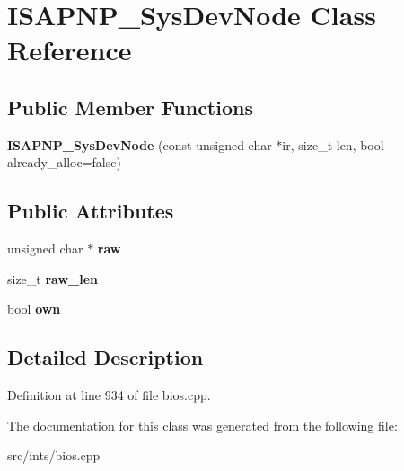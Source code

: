 \hypertarget{classISAPNP__SysDevNode}{\section{I\-S\-A\-P\-N\-P\-\_\-\-Sys\-Dev\-Node Class Reference}
\label{classISAPNP__SysDevNode}
}
\subsection*{Public Member Functions}
\begin{DoxyCompactItemize}
\item 
\hypertarget{classISAPNP__SysDevNode_a08b686d61113d6cd7a7783568515481f}{{\bfseries I\-S\-A\-P\-N\-P\-\_\-\-Sys\-Dev\-Node} (const unsigned char $\ast$ir, size\-\_\-t len, bool already\-\_\-alloc=false)}\label{classISAPNP__SysDevNode_a08b686d61113d6cd7a7783568515481f}

\end{DoxyCompactItemize}
\subsection*{Public Attributes}
\begin{DoxyCompactItemize}
\item 
\hypertarget{classISAPNP__SysDevNode_a88b23d674e4b48999a46d838dff47b7b}{unsigned char $\ast$ {\bfseries raw}}\label{classISAPNP__SysDevNode_a88b23d674e4b48999a46d838dff47b7b}

\item 
\hypertarget{classISAPNP__SysDevNode_a599de9be7c4895bfc76204eed3743fe4}{size\-\_\-t {\bfseries raw\-\_\-len}}\label{classISAPNP__SysDevNode_a599de9be7c4895bfc76204eed3743fe4}

\item 
\hypertarget{classISAPNP__SysDevNode_a0a342171b0ed0789f665868c14e9e6cc}{bool {\bfseries own}}\label{classISAPNP__SysDevNode_a0a342171b0ed0789f665868c14e9e6cc}

\end{DoxyCompactItemize}


\subsection{Detailed Description}


Definition at line 934 of file bios.\-cpp.



The documentation for this class was generated from the following file\-:\begin{DoxyCompactItemize}
\item 
src/ints/bios.\-cpp\end{DoxyCompactItemize}
